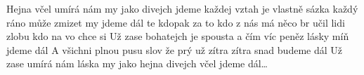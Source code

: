 \begin{TEXT}{Hejna včel}
\SLOKA {} umírá nám  \NL
my jako  divejch  jdeme    
\SLOKA každej vztah je vlastně sázka \NL
každý ráno může zmizet                        my jdeme dál 
\REFREN  {}te kdopak za to  \NL
kdo z nás má  něco br \NL
{} učil lidi zlobu  \NL
kdo na vo chce si 
\SLOKA Už zase bohatejch je spousta \NL
a čím víc peněz lásky míň                    jdeme dál
\SLOKA A všichni plnou pusu slov \NL
že prý už zítra zítra snad                    budeme dál
\REFREN 
\SLOKA Už zase umírá nám láska \NL
my jako hejna divejch včel \NL
jdeme dál…
\end{TEXT}
